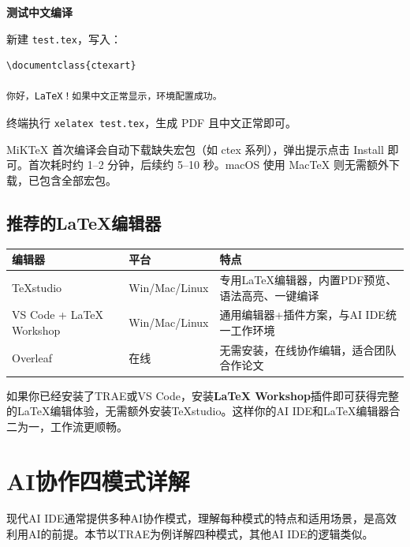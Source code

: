 \textbf{测试中文编译}

新建 \texttt{test.tex}，写入：

\begin{lstlisting}
\documentclass{ctexart}

你好，LaTeX！如果中文正常显示，环境配置成功。

\end{lstlisting}

终端执行 \texttt{xelatex test.tex}，生成 PDF 且中文正常即可。

\begin{notebox}[首次编译提示]
MiKTeX 首次编译会自动下载缺失宏包（如 ctex 系列），弹出提示点击 Install 即可。首次耗时约 1--2 分钟，后续约 5--10 秒。macOS 使用 MacTeX 则无需额外下载，已包含全部宏包。
\end{notebox}

\subsection{推荐的LaTeX编辑器}

\begin{table}[H]
\centering
\begin{tabular}{llp{5cm}}
\toprule
\textbf{编辑器} & \textbf{平台} & \textbf{特点} \\
\midrule
TeXstudio & Win/Mac/Linux & 专用LaTeX编辑器，内置PDF预览、语法高亮、一键编译 \\
VS Code + LaTeX Workshop & Win/Mac/Linux & 通用编辑器+插件方案，与AI IDE统一工作环境 \\
Overleaf & 在线 & 无需安装，在线协作编辑，适合团队合作论文 \\
\bottomrule
\end{tabular}
\end{table}

\begin{practicebox}[推荐方案]
如果你已经安装了TRAE或VS Code，安装\textbf{LaTeX Workshop}插件即可获得完整的LaTeX编辑体验，无需额外安装TeXstudio。这样你的AI IDE和LaTeX编辑器合二为一，工作流更顺畅。
\end{practicebox}

\section{AI协作四模式详解}

现代AI IDE通常提供多种AI协作模式，理解每种模式的特点和适用场景，是高效利用AI的前提。本节以TRAE为例详解四种模式，其他AI IDE的逻辑类似。

